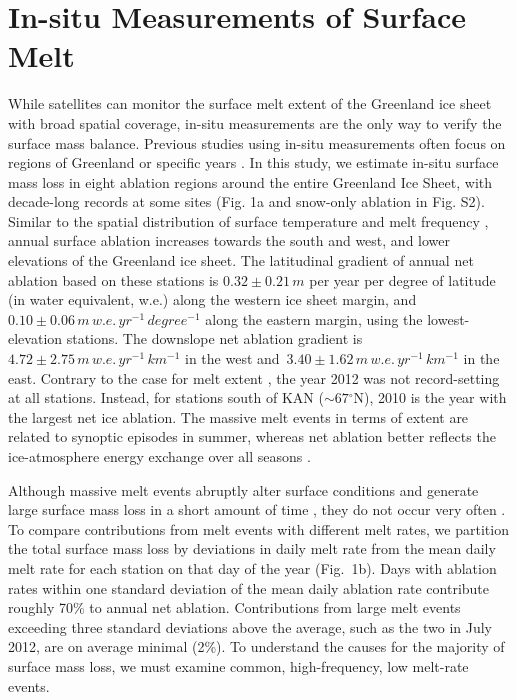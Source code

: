 \documentclass[draft]{agujournal2019}
\begin{document}
\section{In-situ Measurements of Surface Melt}
While satellites can monitor the surface melt extent of 
the Greenland ice sheet with broad spatial coverage, 
in-situ measurements are the only way to verify the surface mass balance.
Previous studies using in-situ measurements 
often focus on regions of Greenland \cite{VanAs2011a, VandeWal2005, VandenBroeke2011}
or specific years \cite{Fausto2016a}. 
In this study, we estimate in-situ surface mass loss 
in eight ablation regions 
around the entire Greenland Ice Sheet, 
with decade-long records at some sites 
(Fig. 1a and snow-only ablation in Fig. S2). 
Similar to the spatial distribution of 
surface temperature and melt frequency \cite{Mernild2011, Hall2013}, 
annual surface ablation increases towards the south and west, 
and lower elevations of the Greenland ice sheet. 
The latitudinal gradient of annual net ablation 
based on these stations is $0.32 \pm 0.21\,m$ 
per year per degree of latitude (in water equivalent, w.e.) 
along the western ice sheet margin, and $0.10 \pm 0.06\,m\,w.e.\,yr^{-1}\,degree^{-1}$ along the eastern margin, 
using the lowest-elevation stations. 
The downslope net ablation gradient 
is $4.72 \pm 2.75 \,m\,w.e.\, yr^{-1}\, km^{-1}$ 
in the west and $3.40 \pm 1.62 \,m\,w.e.\, yr^{-1}\, km^{-1}$ in the east.
Contrary to the case for melt extent \cite{Nghiem2012}, 
the year 2012 was not record-setting at all stations. 
Instead, for stations south of KAN ($\sim 67\mathrm{^{\circ} N}$), 
2010 is the year with the largest net ice ablation. 
The massive melt events in terms of extent 
are related to synoptic episodes in summer, 
whereas net ablation better reflects 
the ice-atmosphere energy exchange over all seasons \cite{Valisuo2018}. 

Although massive melt events abruptly
alter surface conditions and generate large surface mass loss 
in a short amount of time \cite{Fausto2016a}, 
they do not occur very often \cite{Nghiem2012}.
To compare contributions from melt events with different melt rates, 
we partition the total surface mass loss by 
deviations in daily melt rate from the mean daily melt rate 
for each station on that day of the year (Fig.~1b). 
Days with ablation rates within one standard deviation of 
the mean daily ablation rate contribute roughly 70\% to annual net ablation.
Contributions from large melt events exceeding 
three standard deviations above the average, 
such as the two in July 2012, are on average minimal (2\%). 
To understand the causes for the majority of surface mass loss, 
we must examine common, high-frequency, low melt-rate events.
\end{document}
